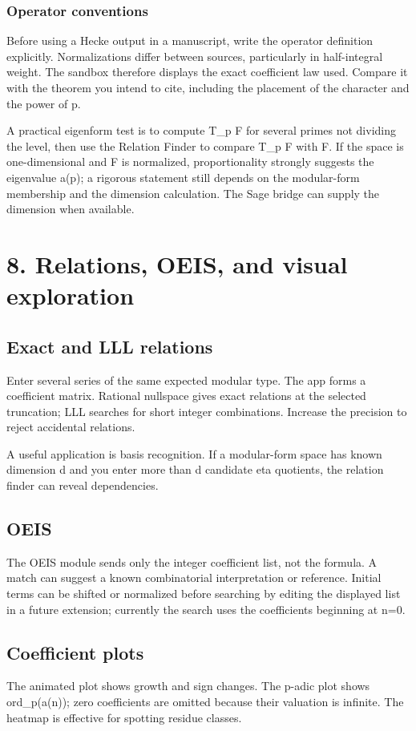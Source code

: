 \documentclass[11pt]{article}
\begin{document}
\subsubsection*{Operator conventions}
Before using a Hecke output in a manuscript, write the operator definition explicitly. Normalizations differ between sources, particularly in half-integral weight. The sandbox therefore displays the exact coefficient law used. Compare it with the theorem you intend to cite, including the placement of the character and the power of p.

A practical eigenform test is to compute T\_p F for several primes not dividing the level, then use the Relation Finder to compare T\_p F with F. If the space is one-dimensional and F is normalized, proportionality strongly suggests the eigenvalue a(p); a rigorous statement still depends on the modular-form membership and the dimension calculation. The Sage bridge can supply the dimension when available.

\newpage
\section{8. Relations, OEIS, and visual exploration}
\subsection*{Exact and LLL relations}
Enter several series of the same expected modular type. The app forms a coefficient matrix. Rational nullspace gives exact relations at the selected truncation; LLL searches for short integer combinations. Increase the precision to reject accidental relations.

A useful application is basis recognition. If a modular-form space has known dimension d and you enter more than d candidate eta quotients, the relation finder can reveal dependencies.

\subsection*{OEIS}
The OEIS module sends only the integer coefficient list, not the formula. A match can suggest a known combinatorial interpretation or reference. Initial terms can be shifted or normalized before searching by editing the displayed list in a future extension; currently the search uses the coefficients beginning at n=0.

\subsection*{Coefficient plots}
The animated plot shows growth and sign changes. The p-adic plot shows ord\_p(a(n)); zero coefficients are omitted because their valuation is infinite. The heatmap is effective for spotting residue classes.
\end{document}
